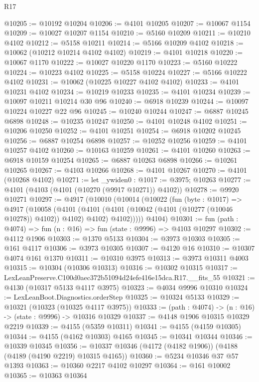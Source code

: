 \begin{lexlean}{R17}
\begin{coremodule}
@10205 := @10192 @10204
@10206 := @4101 @10205
@10207 := @10067 @1154
@10209 := @10027 @10207 @1154
@10210 := @5160 @10209
@10211 := @10210 @4102
@10212 := @5158 @10211
@10214 := @5166 @10209 @4102
@10218 := @10062 (@10212 @10214 @4102 @4102)
@10219 := @4101 @10218
@10220 := @10067 @1170
@10222 := @10027 @10220 @1170
@10223 := @5160 @10222
@10224 := @10223 @4102
@10225 := @5158 @10224
@10227 := @5166 @10222 @4102
@10231 := @10062 (@10225 @10227 @4102 @4102)
@10233 := @4101 @10231 @4102
@10234 := @10219 @10233
@10235 := @4101 @10234
@10239 := @10097 @10211 @10214 @30 @96
@10240 := @6918 @10239
@10244 := @10097 @10224 @10227 @22 @96
@10245 := @10240 @10244
@10247 := @6887 @10245 @6898
@10248 := @10235 @10247
@10250 := @4101 @10248 @4102
@10251 := @10206 @10250
@10252 := @4101 @10251
@10254 := @6918 @10202 @10245
@10256 := @6887 @10254 @6898
@10257 := @10252 @10256
@10259 := @4101 @10257 @4102
@10260 := @10163 @10259
@10261 := @4101 @10260
@10263 := @6918 @10159 @10254
@10265 := @6887 @10263 @6898
@10266 := @10261 @10265
@10267 := @4103 @10266
@10268 := @4101 @10267
@10270 := @4101 (@10268 @4102)
@10271 := let _ywiden0 : @1017 := @3975; @10263
@10277 := @4101 (@4103 (@4101 (@10270 (@9917 @10271)) @4102))
@10278 := @9920 @10271
@10297 := @4917
    (@10010
      (@10014
        (@10022
          (fun (byte : @1017) =>
          @4917
            (@10058
              (@4101
                (@4101 (@4101 (@10042 (@4101 (@10277 (@10046 @10278)) @4102)) @4102) @4102)
                @4102)))))
      @4104)
@10301 := fun (path : @4074) => fun (n : @16) => fun (state : @9996) => @4103 @10297
@10302 := @4112 @1906
@10303 := @1370 @5133
@10304 := @3973 @10303
@10305 := @161 @4117
@10306 := @3973 @10305
@10307 := @4120 @16
@10310 := @10307 @4074 @161 @1370
@10311 := @10310 @3975
@10313 := @3973 @10311 @4003
@10315 := @10304 (@10306 @10313)
@10316 := @10302 @10315
@10317 := LexLeanPreserve.C100d0aec372b51094d24efe416e15dca.R17.__fits_55
@10321 := @4130 (@10317 @5133 @4117 @3975)
@10323 := @4034 @9996 @10310
@10324 := LexLeanBoot.Diagnostics.orderStep
@10325 := @10324 @5133
@10329 := @10321 (@10323 (@10325 @4117 @3975))
@10333 := (path : @4074) -> (n : @16) -> (state : @9996) -> @10316 @10329
@10337 := @4148 @1906 @10315 @10329 @2219
@10339 := @4155 (@5359 @10311)
@10341 := @4155 (@4159 @10305)
@10344 := @4155 (@4162 @10303) @4165
@10345 := @10341 @10344
@10346 := @10339 @10345
@10356 := @10337 @10346 (@4172 (@4182 @1906)) (@4188 (@4189 (@4190 @2219) @10315 @4165))
@10360 := @5234 @10346 @37 @57 @1393
@10363 := @10360 @2217 @4102 @10297
@10364 := @161 @10002
@10365 := @10363 @10364

\end{coremodule}
\end{lexlean}
